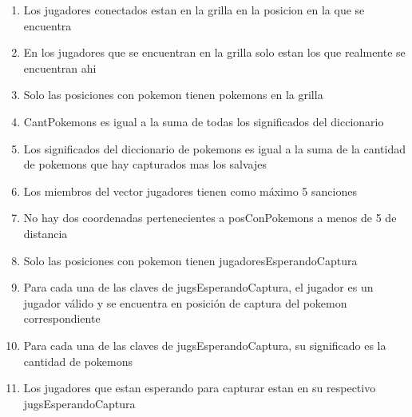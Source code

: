 \begin{Representacion}
\begin{enumerate}
		\item Los jugadores conectados estan en la grilla en la posicion en la que se encuentra 

		\item En los jugadores que se encuentran en la grilla solo estan los que realmente se encuentran ahi 

		\item Solo las posiciones con pokemon tienen pokemons en la grilla

		\item CantPokemons es igual a la suma de todas los significados del diccionario 

		\item Los significados del diccionario de pokemons es igual a la suma de la cantidad de pokemons que hay capturados mas los salvajes 

		\item Los miembros del vector jugadores tienen como máximo 5 sanciones 

		\item No hay dos coordenadas pertenecientes a posConPokemons a menos de 5 de distancia

		\item Solo las posiciones con pokemon tienen jugadoresEsperandoCaptura

		\item Para cada una de las claves de jugsEsperandoCaptura, el jugador es un jugador válido y se encuentra en posición de captura del pokemon correspondiente

		\item Para cada una de las claves de jugsEsperandoCaptura, su significado es la cantidad de pokemons

		\item Los jugadores que estan esperando para capturar estan en su respectivo jugsEsperandoCaptura



	\end{enumerate}




\end{Representacion}
